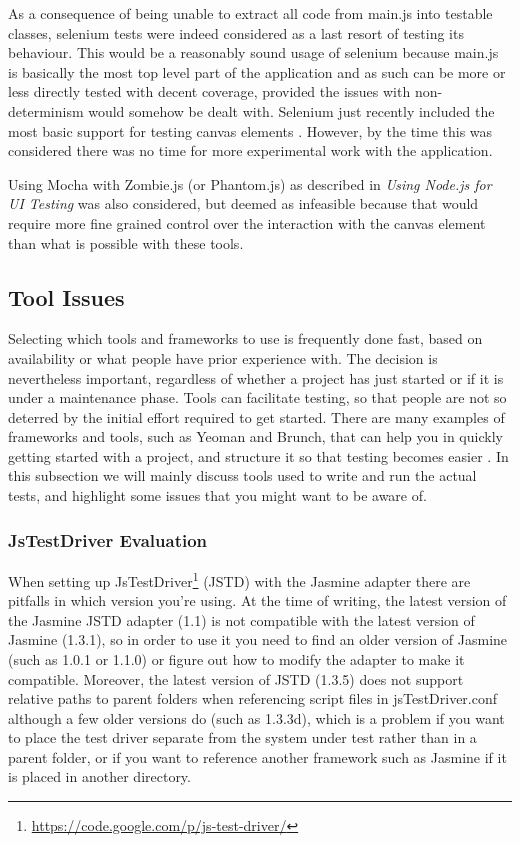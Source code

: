 \documentclass[11pt]{article}
\begin{document}
As a consequence of being unable to extract all code from main.js into testable classes, selenium tests were indeed considered as a last resort of testing its behaviour. This would be a reasonably sound usage of selenium because main.js is basically the most top level part of the application and as such can be more or less directly tested with decent coverage, provided the issues with non-determinism would somehow be dealt with. Selenium just recently included the most basic support for testing canvas elements \cite[p.~165-166]{Selenium2}. However, by the time this was considered there was no time for more experimental work with the application.

Using Mocha with Zombie.js (or Phantom.js) as described in \emph{Using Node.js for UI Testing} \cite{UsingNode} was also considered, but deemed as infeasible because that would require more fine grained control over the interaction with the canvas element than what is possible with these tools.

\subsection{Tool Issues}

Selecting which tools and frameworks to use is frequently done fast, based on availability or what people have prior experience with. The decision is nevertheless important, regardless of whether a project has just started or if it is under a maintenance phase. Tools can facilitate testing, so that people are not so deterred by the initial effort required to get started. There are many examples of frameworks and tools, such as Yeoman and Brunch, that can help you in quickly getting started with a project, and structure it so that testing becomes easier \cite[questions~11]{Edelstam}. In this subsection we will mainly discuss tools used to write and run the actual tests, and highlight some issues that you might want to be aware of.

\subsubsection{JsTestDriver Evaluation}
\label{subsec:jstestdriver}

When setting up JsTestDriver\footnote{\url{https://code.google.com/p/js-test-driver/}} (JSTD) with the Jasmine adapter there are pitfalls in which version you're using. At the time of writing, the latest version of the Jasmine JSTD adapter (1.1) is not compatible with the latest version of Jasmine (1.3.1), so in order to use it you need to find an older version of Jasmine (such as 1.0.1 or 1.1.0) or figure out how to modify the adapter to make it compatible. Moreover, the latest version of JSTD (1.3.5) does not support relative paths to parent folders when referencing script files in jsTestDriver.conf although a few older versions do (such as 1.3.3d), which is a problem if you want to place the test driver separate from the system under test rather than in a parent folder, or if you want to reference another framework such as Jasmine if it is placed in another directory. %
\end{document}
